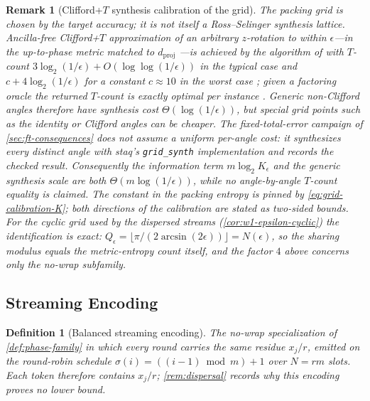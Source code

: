 \documentclass[a4paper,twocolumn,10pt,unpublished]{quantumarticle}
\newtheorem{definition}{Definition}
\newtheorem{remark}{Remark}
\begin{document}
\begin{remark}[Clifford+$T$ synthesis calibration of the grid]
\label{rem:rs-grid}
The packing grid is chosen by the target accuracy; it is not itself a
Ross--Selinger synthesis lattice.  Ancilla-free
Clifford+$T$ approximation of an arbitrary $z$-rotation to within
$\epsilon$---in the up-to-phase metric matched to $d_{\mathrm{proj}}$
\cite[Def.~9.1, Cor.~9.5, Alg.~9.8]{ross2016optimal}---is achieved by
the algorithm of \cite[Alg.~7.6]{ross2016optimal} with $T$-count
$3\log_2(1/\epsilon)+O(\log\log(1/\epsilon))$ in the typical case and
$c+4\log_2(1/\epsilon)$ for a constant $c\approx10$ in the worst case
\cite[Prop.~8.8 and \S8.3]{ross2016optimal}; given a factoring oracle
the returned $T$-count is exactly optimal per instance
\cite[Prop.~8.2]{ross2016optimal}.  Generic non-Clifford angles therefore
have synthesis cost $\Theta(\log(1/\epsilon))$, but special grid points
such as the identity or Clifford angles can be cheaper.  The
fixed-total-error campaign of \cref{sec:ft-consequences} does not assume a
uniform per-angle cost: it synthesizes every distinct angle with staq's
\texttt{grid\_synth} implementation and records the checked result.
Consequently the information term $m\log_2K_\epsilon$ and the generic
synthesis scale are both $\Theta(m\log(1/\epsilon))$, while no
angle-by-angle $T$-count equality is claimed.  The constant in the
packing entropy is pinned by \eqref{eq:grid-calibration-K}; both directions
of the calibration are stated as two-sided bounds.  For the cyclic grid used by the dispersed
streams (\cref{cor:w1-epsilon-cyclic}) the identification is exact:
$Q_\epsilon=\lfloor\pi/(2\arcsin(2\epsilon))\rfloor=N(\epsilon)$, so the
sharing modulus equals the metric-entropy count itself, and the factor
$4$ above concerns only the no-wrap subfamily.
\end{remark}

\subsection{Streaming Encoding}

\begin{definition}[Balanced streaming encoding]
\label{def:streaming-encoding}
The no-wrap specialization of \cref{def:phase-family} in which every round
carries the same residue $x_j/r$, emitted on the round-robin schedule
$\sigma(i)=((i-1)\bmod m)+1$ over $N=rm$ slots.  Each token therefore
contains $x_j/r$; \cref{rem:dispersal} records why this encoding proves no
lower bound.
\end{definition}
\end{document}
